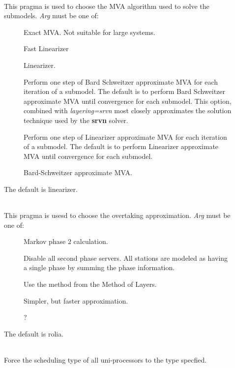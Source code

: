 \begin{description}
\item[]~\\
This pragma is used to choose the MVA algorithm used to solve the submodels.
\emph{Arg} must be one of: 
\begin{description}
\item[]
Exact MVA.  Not suitable for large systems.
\item[]
Fast Linearizer
\item[]
Linearizer.
\item[]
Perform one step of Bard Schweitzer approximate MVA for each iteration of a submodel.  The default is to perform Bard Schweitzer approximate MVA until convergence for each submodel.  This option, combined with \emph{layering=srvn} most closely approximates the solution technique used by the \textbf{srvn} solver.
\item[]
Perform one step of Linearizer approximate MVA for each iteration of a submodel.  The default is to perform Linearizer approximate MVA until convergence for each submodel.
\item[]
Bard-Schweitzer approximate MVA.
\end{description}
The default is linearizer.
\item[]~\\
This pragma is usesd to choose the overtaking approximation.
\emph{Arg} must be one of: 
\begin{description}
\item[]
Markov phase 2 calculation.
\item[]
Disable all second phase servers.  All stations are modeled as having a single phase by summing the phase information.
\item[]
Use the method from the Method of Layers.
\item[]
Simpler, but faster approximation.
\item[]
?
\end{description}
The default is rolia.
\item[]~\\
Force the scheduling type of all uni-processors to the type specfied.

\end{description}
